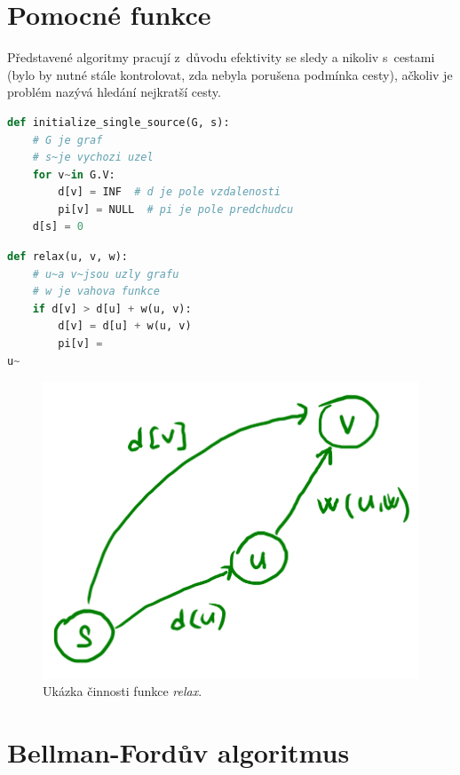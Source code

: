 
\section{Pomocné funkce}

Představené algoritmy pracují z~důvodu efektivity se sledy a nikoliv s~cestami (bylo by nutné stále kontrolovat, zda nebyla porušena podmínka cesty), ačkoliv je problém nazývá hledání nejkratší cesty.

\bigskip\noindent\begin{minipage}{\linewidth}
\begin{lstlisting}[language=Python, caption={Pomocná inicializační funkce. Složitost je $\Theta(n)$, kde $n$ je počet uzlů.}]
def initialize_single_source(G, s):
    # G je graf
    # s~je vychozi uzel
    for v~in G.V:
        d[v] = INF  # d je pole vzdalenosti
        pi[v] = NULL  # pi je pole predchudcu
    d[s] = 0
\end{lstlisting}
\end{minipage}

\noindent\begin{minipage}{\linewidth}
\begin{lstlisting}[language=Python, caption={Pomocná funkce \textit{relax}. Složitost je $O(1)$.}]
def relax(u, v, w):
    # u~a v~jsou uzly grafu
    # w je vahova funkce
    if d[v] > d[u] + w(u, v):
        d[v] = d[u] + w(u, v)
        pi[v] =
u~\end{lstlisting}
\end{minipage}

\begin{figure}[H]
    \centering
    \includegraphics[width=0.4\linewidth]{relax.png}
    \caption{Ukázka činnosti funkce \textit{relax}.}
\end{figure}


\section{Bellman-Fordův algoritmus}

